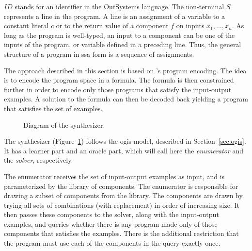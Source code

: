 \noindent
$ID$ stands for an identifier in the OutSystems language. The non-terminal $S$
represents a line in the program. A line is an assignment of a variable to a
constant literal $c$ or to the return value of a component $f$ on inputs $x_1,
..., x_n$. As long as the program is well-typed, an input to a component can
be one of the inputs of the program, or variable defined in a preceding line.
Thus, the general structure of a program in \gls{ssa} form is a sequence of
assignments.

The approach described in this section is based on
\citeauthor{Jha:oracle:2010}'s program encoding. The idea is to encode the
program space in a formula. The formula is then constrained further in order to
encode only those programs that satisfy the input-output examples. A solution to
the formula can then be decoded back yielding a program that satisfies the set
of examples.

\begin{figure}
  \centering

  \caption{Diagram of the synthesizer.}
  \label{fig:synth-setwise}
\end{figure}

The synthesizer (Figure~\ref{fig:synth-setwise}) follows the \gls{ogis} model,
described in Section~\ref{sec:ogis}. It has a learner part and an oracle part,
which will call here the \textit{enumerator} and the \textit{solver},
respectively.

The enumerator receives the set of input-output examples as input, and is
parameterized by the library of components. The enumerator is responsible for
drawing a subset of components from the library. The components are drawn by
trying all sets of combinations (with replacement) in order of increasing size.
It then passes these components to the solver, along with the input-output
examples, and queries whether there is any program made only of those components
that satisfies the examples. There is the additional restriction that the
program must use each of the components in the query exactly once.

